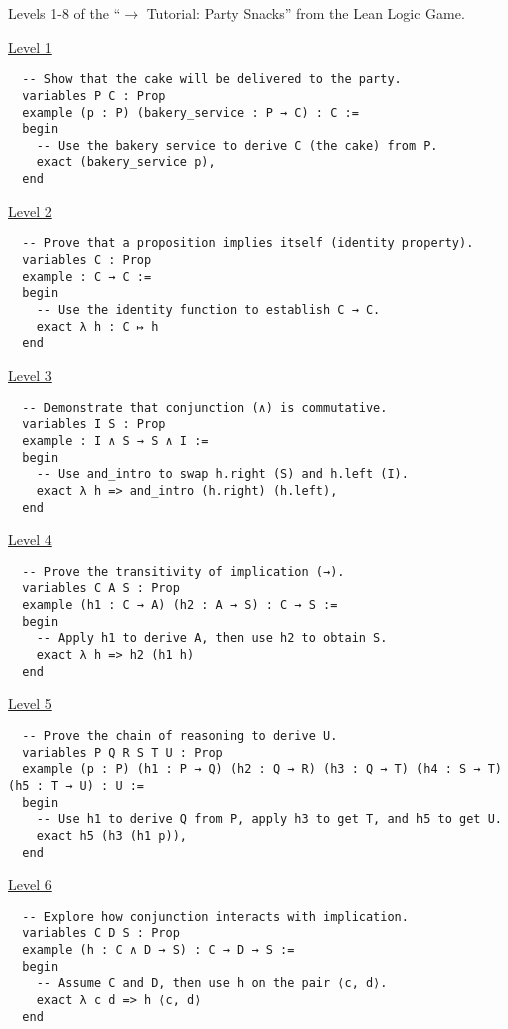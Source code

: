 \documentclass{article}
\theoremstyle{theorem}
\theoremstyle{definition}
\theoremstyle{remark}
\begin{document}
Levels 1-8 of the ``\(\rightarrow\) Tutorial: Party Snacks'' from the Lean Logic Game.

\medskip\noindent\centerline{\underline{Level 1}}

\begin{verbatim}
  -- Show that the cake will be delivered to the party.
  variables P C : Prop
  example (p : P) (bakery_service : P → C) : C :=
  begin
    -- Use the bakery service to derive C (the cake) from P.
    exact (bakery_service p),
  end
\end{verbatim}

\medskip\noindent\centerline{\underline{Level 2}}

\begin{verbatim}
  -- Prove that a proposition implies itself (identity property).
  variables C : Prop
  example : C → C :=
  begin
    -- Use the identity function to establish C → C.
    exact λ h : C ↦ h
  end
\end{verbatim}

\medskip\noindent\centerline{\underline{Level 3}}

\begin{verbatim}
  -- Demonstrate that conjunction (∧) is commutative.
  variables I S : Prop
  example : I ∧ S → S ∧ I :=
  begin
    -- Use and_intro to swap h.right (S) and h.left (I).
    exact λ h => and_intro (h.right) (h.left),
  end
\end{verbatim}

\medskip\noindent\centerline{\underline{Level 4}}

\begin{verbatim}
  -- Prove the transitivity of implication (→).
  variables C A S : Prop
  example (h1 : C → A) (h2 : A → S) : C → S :=
  begin
    -- Apply h1 to derive A, then use h2 to obtain S.
    exact λ h => h2 (h1 h)
  end
\end{verbatim}

\medskip\noindent\centerline{\underline{Level 5}}

\begin{verbatim}
  -- Prove the chain of reasoning to derive U.
  variables P Q R S T U : Prop
  example (p : P) (h1 : P → Q) (h2 : Q → R) (h3 : Q → T) (h4 : S → T) (h5 : T → U) : U :=
  begin
    -- Use h1 to derive Q from P, apply h3 to get T, and h5 to get U.
    exact h5 (h3 (h1 p)),
  end
\end{verbatim}

\medskip\noindent\centerline{\underline{Level 6}}

\begin{verbatim}
  -- Explore how conjunction interacts with implication.
  variables C D S : Prop
  example (h : C ∧ D → S) : C → D → S :=
  begin
    -- Assume C and D, then use h on the pair ⟨c, d⟩.
    exact λ c d => h ⟨c, d⟩
  end
\end{verbatim}
\end{document}
